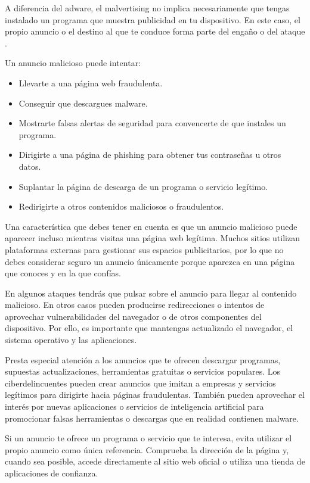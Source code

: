 \documentclass[
  spanish,
  a4paper,
  openany]{book}
\begin{document}
A diferencia del adware, el malvertising no implica necesariamente que tengas instalado un programa que muestra publicidad en tu dispositivo. En este caso, el propio anuncio o el destino al que te conduce forma parte del engaño o del ataque \citep{INCIBE-malvertising}.

Un anuncio malicioso puede intentar:

\begin{itemize}
\item
  Llevarte a una página web fraudulenta.
\item
  Conseguir que descargues malware.
\item
  Mostrarte falsas alertas de seguridad para convencerte de que instales un programa.
\item
  Dirigirte a una página de phishing para obtener tus contraseñas u otros datos.
\item
  Suplantar la página de descarga de un programa o servicio legítimo.
\item
  Redirigirte a otros contenidos maliciosos o fraudulentos.
\end{itemize}

Una característica que debes tener en cuenta es que un anuncio malicioso puede aparecer incluso mientras visitas una página web legítima. Muchos sitios utilizan plataformas externas para gestionar sus espacios publicitarios, por lo que no debes considerar seguro un anuncio únicamente porque aparezca en una página que conoces y en la que confías.

En algunos ataques tendrás que pulsar sobre el anuncio para llegar al contenido malicioso. En otros casos pueden producirse redirecciones o intentos de aprovechar vulnerabilidades del navegador o de otros componentes del dispositivo. Por ello, es importante que mantengas actualizado el navegador, el sistema operativo y las aplicaciones.

Presta especial atención a los anuncios que te ofrecen descargar programas, supuestas actualizaciones, herramientas gratuitas o servicios populares. Los ciberdelincuentes pueden crear anuncios que imitan a empresas y servicios legítimos para dirigirte hacia páginas fraudulentas. También pueden aprovechar el interés por nuevas aplicaciones o servicios de inteligencia artificial para promocionar falsas herramientas o descargas que en realidad contienen malware.

Si un anuncio te ofrece un programa o servicio que te interesa, evita utilizar el propio anuncio como única referencia. Comprueba la dirección de la página y, cuando sea posible, accede directamente al sitio web oficial o utiliza una tienda de aplicaciones de confianza.
\end{document}
